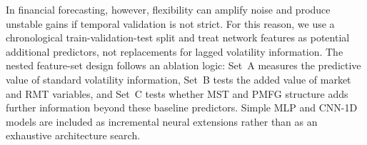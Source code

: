In financial forecasting, however, flexibility can amplify noise and produce unstable gains if temporal validation is not strict. For this reason, we use a chronological train-validation-test split and treat network features as potential additional predictors, not replacements for lagged volatility information. The nested feature-set design follows an ablation logic: Set~A measures the predictive value of standard volatility information, Set~B tests the added value of market and RMT variables, and Set~C tests whether MST and PMFG structure adds further information beyond these baseline predictors. Simple MLP and CNN-1D models are included as incremental neural extensions rather than as an exhaustive architecture search.
